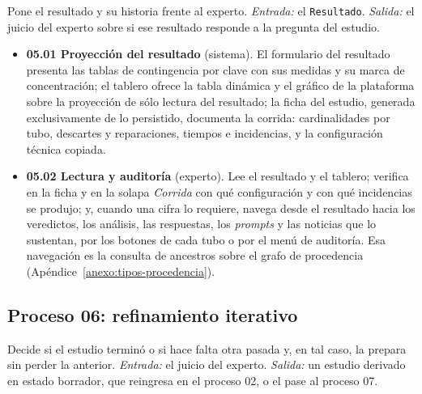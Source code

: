 \documentclass[12pt]{report}
\begin{document}
Pone el resultado y su historia frente al experto. \textit{Entrada:} el \texttt{Resultado}. \textit{Salida:} el juicio del experto sobre si ese resultado responde a la pregunta del estudio.

\begin{itemize}
  \item \textbf{05.01 Proyección del resultado} (sistema). El formulario del resultado presenta las tablas de contingencia por clave con sus medidas y su marca de concentración; el tablero ofrece la tabla dinámica y el gráfico de la plataforma sobre la proyección de sólo lectura del resultado; la ficha del estudio, generada exclusivamente de lo persistido, documenta la corrida: cardinalidades por tubo, descartes y reparaciones, tiempos e incidencias, y la configuración técnica copiada.
  \item \textbf{05.02 Lectura y auditoría} (experto). Lee el resultado y el tablero; verifica en la ficha y en la solapa \textit{Corrida} con qué configuración y con qué incidencias se produjo; y, cuando una cifra lo requiere, navega desde el resultado hacia los veredictos, los análisis, las respuestas, los \textit{prompts} y las noticias que lo sustentan, por los botones de cada tubo o por el menú de auditoría. Esa navegación es la consulta de ancestros sobre el grafo de procedencia (Apéndice~\ref{anexo:tipos-procedencia}).
\end{itemize}

\subsection{Proceso 06: refinamiento iterativo}
\label{sec:proc-refinamiento}

Decide si el estudio terminó o si hace falta otra pasada y, en tal caso, la prepara sin perder la anterior. \textit{Entrada:} el juicio del experto. \textit{Salida:} un estudio derivado en estado borrador, que reingresa en el proceso 02, o el pase al proceso 07.
\end{document}
